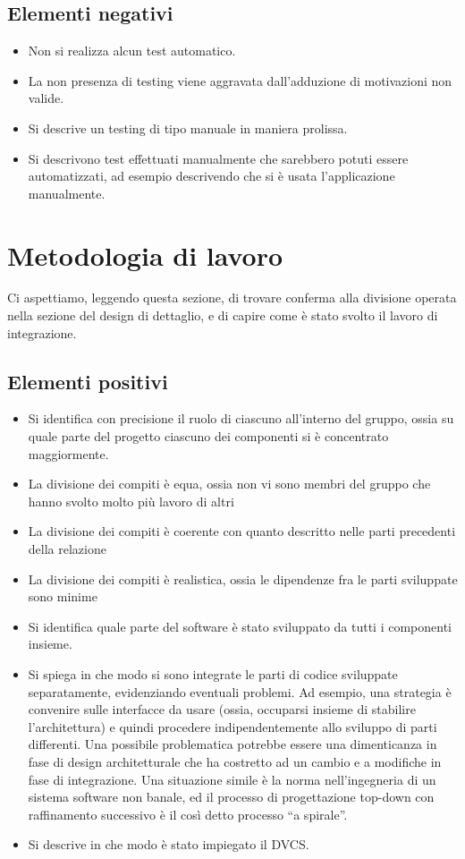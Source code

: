 \documentclass[a4paper,12pt]{report}
\begin{document}
\subsection*{Elementi negativi}
\begin{itemize}
 \item Non si realizza alcun test automatico.
 \item La non presenza di testing viene aggravata dall'adduzione di motivazioni non valide.
 \item Si descrive un testing di tipo manuale in maniera prolissa.
 \item Si descrivono test effettuati manualmente che sarebbero potuti essere automatizzati, ad esempio descrivendo che si è usata l'applicazione manualmente.
\end{itemize}

\section{Metodologia di lavoro}

Ci aspettiamo, leggendo questa sezione, di trovare conferma alla divisione operata nella sezione del design di dettaglio, e di capire come è stato svolto il lavoro di integrazione.

\subsection*{Elementi positivi}

\begin{itemize}
	\item Si identifica con precisione il ruolo di ciascuno all'interno del gruppo, ossia su quale parte del progetto ciascuno dei componenti si è concentrato maggiormente.
	\item La divisione dei compiti è equa, ossia non vi sono membri del gruppo che hanno svolto molto più lavoro di altri
	\item La divisione dei compiti è coerente con quanto descritto nelle parti precedenti della relazione
	\item La divisione dei compiti è realistica, ossia le dipendenze fra le parti sviluppate sono minime
	\item Si identifica quale parte del software è stato sviluppato da tutti i componenti insieme.
	\item Si spiega in che modo si sono integrate le parti di codice sviluppate separatamente, evidenziando eventuali problemi. Ad esempio, una strategia è convenire sulle interfacce da usare (ossia, occuparsi insieme di stabilire l'architettura) e quindi procedere indipendentemente allo sviluppo di parti differenti. Una possibile problematica potrebbe essere una dimenticanza in fase di design architetturale che ha costretto ad un cambio e a modifiche in fase di integrazione. Una situazione simile è la norma nell'ingegneria di un sistema software non banale, ed il processo di progettazione top-down con raffinamento successivo è il così detto processo ``a spirale''.
	\item Si descrive in che modo è stato impiegato il DVCS.
\end{itemize}
\end{document}
